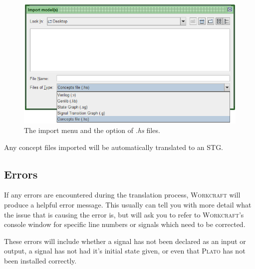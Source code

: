 \documentclass[british,conference,compsoc]{IEEEtran}
\newcommand{\noun}[1]{\textsc{#1}}
\begin{document}
\begin{figure}[H]
\begin{centering}
\vspace{-3mm}
\includegraphics[scale=0.4]{Images/import_menu_screenshot.png}
\par\end{centering}

\begin{centering}
\protect\caption{\label{fig:import_menu_screenshot}The import menu and the 
			option of \emph{.hs} files.}

\par\end{centering}
\vspace{-3mm}
\end{figure}

Any concept files imported will be automatically translated to an STG.

\vspace{-3mm}

\subsection{Errors}

\vspace{-2mm}

If any errors are encountered during the translation process, \noun{Workcraft} 
will produce a helpful error message. This usually can tell you with more 
detail what the issue that is causing the error is, but will ask you to refer 
to \noun{Workcraft}'s console window for specific line numbers or signals which
need to be corrected. 

These errors will include whether a signal has not been declared as an input or
output, a signal has not had it's initial state given, or even that \noun{Plato}
has not been installed correctly. 
\end{document}

